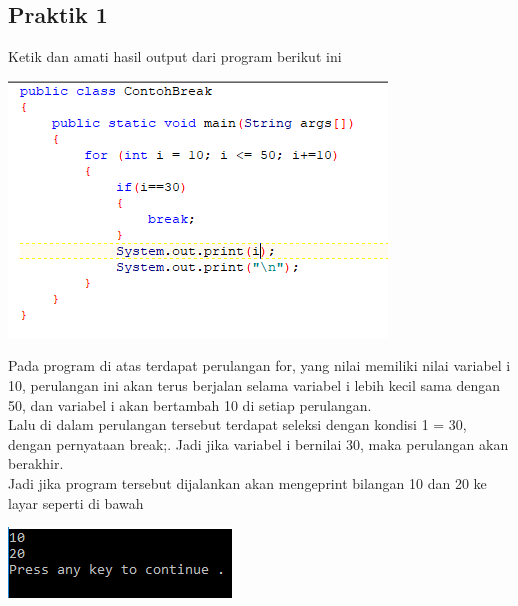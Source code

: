 \documentclass[a4paper,12pt]{article}
\begin{document}
\subsection{Praktik 1}
Ketik dan amati hasil output dari program berikut ini\\
\begin{center}
    \includegraphics[scale=1]{image1}
\end{center}
Pada program di atas terdapat perulangan for, yang nilai memiliki nilai variabel i 10, perulangan ini akan terus berjalan selama variabel i lebih kecil sama dengan 50, dan variabel i akan bertambah 10 di setiap perulangan.\\
Lalu di dalam perulangan tersebut terdapat seleksi dengan kondisi 1 = 30, dengan pernyataan break;. Jadi jika variabel i bernilai 30, maka perulangan akan berakhir.\\
Jadi jika program tersebut dijalankan akan mengeprint bilangan 10 dan 20 ke layar seperti di bawah\\
\begin{center}
    \includegraphics[scale=1]{image2}
\end{center}
\end{document}
